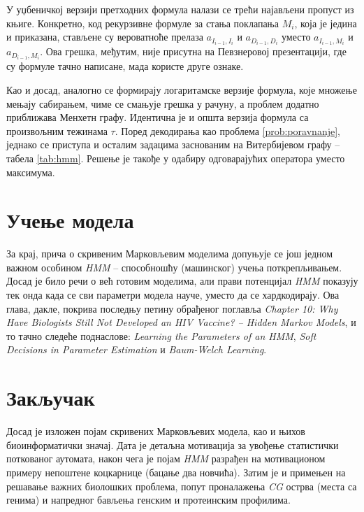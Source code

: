 \documentclass[12pt,oneside]{memoir}
\begin{document}
\begin{CJK}{UTF8}{ipxm}
У уџбеничкој верзији претходних формула налази се трећи најављени пропуст из књиге. Конкретно, код рекурзивне формуле за стања поклапања $M_i$, која је једина и приказана, стављене су вероватноће прелаза $a_{I_{i-1}, I_i}$ и $a_{D_{i-1}, D_i}$ уместо $a_{I_{i-1}, M_i}$ и $a_{D_{i-1}, M_i}$. Ова грешка, међутим, није присутна на Певзнеровој презентацији, где су формуле тачно написане, мада користе друге ознаке.

Као и досад, аналогно се формирају логаритамске верзије формула, које множење мењају сабирањем, чиме се смањује грешка у рачуну, а проблем додатно приближава Менхетн графу. Идентична је и општа верзија формула са произвољним тежинама $\tau$. Поред декодирања као проблема \ref{prob:poravnanje}, једнако се приступа и осталим задацима заснованим на Витербијевом графу -- табела \ref{tab:hmm}. Решење је такође у одабиру одговарајућих оператора уместо максимума.

\chapter{Учење модела}
За крај, прича о скривеним Марковљевим моделима допуњује се још једном важном особином \textit{HMM} -- способношћу (машинског) учења поткрепљивањем. Досад је било речи о већ готовим моделима, али прави потенцијал \textit{HMM} показују тек онда када се сви параметри модела науче, уместо да се хардкодирају. Ова глава, дакле, покрива последњу петину обрађеног поглавља \textit{Chapter 10: Why Have Biologists Still Not Developed an HIV Vaccine? -- Hidden Markov Models}, и то тачно следеће поднаслове: \textit{Learning the Parameters of an HMM}, \textit{Soft Decisions in Parameter Estimation} и \textit{Baum-Welch Learning}.


\chapter{Закључак}
Досад је изложен појам скривених Марковљевих модела, као и њихов биоинформатички значај. Дата је детаљна мотивација за увођење статистички поткованог аутомата, након чега је појам \textit{HMM} разрађен на мотивационом примеру непоштене коцкарнице (бацање два новчића). Затим је и примењен на решавање важних биолошких проблема, попут проналажења \textit{CG} острва (места са генима) и напредног бављења генским и протеинским профилима.


\end{CJK}
\end{document}
